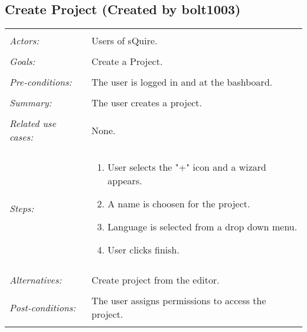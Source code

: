 \documentclass[11pt]{report}
\begin{document}
\subsection{Create Project (Created by bolt1003)}
\begin{tabular}{ p{2cm} p{12cm} }
 \hline
 \\
 \textit{Actors:} & Users of sQuire. \\ 
 \\
 \textit{Goals:} & Create a Project. \\
 \\
 \textit{Pre-conditions:} & The user is logged in and at the bashboard. \\
 \\
 \textit{Summary:} & The user creates a project. \\ 
 \\
 \textit{Related use cases:} & None. \\ 
 \\
 \textit{Steps:} & \begin{enumerate}
  \item User selects the "+" icon and a wizard appears.
  \item A name is choosen for the project.
  \item Language is selected from a drop down menu.
  \item User clicks finish.
 \end{enumerate} \\
 \\
 \textit{Alternatives:} & Create project from the editor. \\
 \\
 \textit{Post-conditions:} & The user assigns permissions to access the project. \\
 \\
\hline
\end{tabular}
\end{document}
